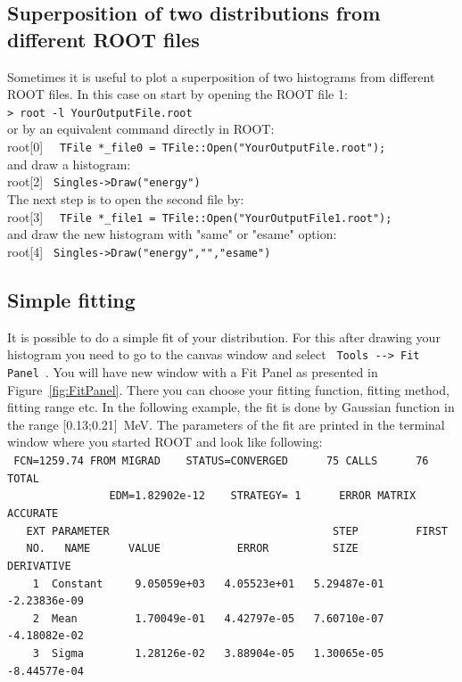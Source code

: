 \documentclass[12pt]{article}
\begin{document}
\clearpage
\subsection{Superposition of two distributions from different ROOT files}
Sometimes it is useful to plot a superposition of two histograms from different ROOT files. In this case on start by opening the ROOT file 1:\\ 

\verb|> root -l YourOutputFile.root |\\

or by an equivalent command directly in ROOT:\\

root[0] \verb|  TFile *_file0 = TFile::Open("YourOutputFile.root");|\\

and draw a histogram:\\

root[2] \verb| Singles->Draw("energy") | \\

The next step is to open the second file by: \\

root[3] \verb|  TFile *_file1 = TFile::Open("YourOutputFile1.root");|\\

and draw the new histogram with "same" or "esame" option:\\

root[4] \verb| Singles->Draw("energy","","esame") |\\


\subsection{Simple fitting}
It is possible to do a simple fit of your distribution. For this after drawing your histogram you need to go to the canvas window and select \verb| Tools --> Fit Panel |. You will have new window with a Fit Panel as presented in Figure~\ref{fig:FitPanel}. There you can choose your fitting function, fitting method, fitting range etc. In the following example, the fit is done by Gaussian function in the range [0.13;0.21]~MeV. The parameters of the fit are printed in the terminal window where you started ROOT and look like following:\\
\verb| FCN=1259.74 FROM MIGRAD    STATUS=CONVERGED      75 CALLS      76 TOTAL|\\
\verb|                EDM=1.82902e-12    STRATEGY= 1      ERROR MATRIX ACCURATE| \\
\verb|   EXT PARAMETER                                   STEP         FIRST|   \\
\verb|   NO.   NAME      VALUE            ERROR          SIZE      DERIVATIVE |\\
\verb|    1  Constant     9.05059e+03   4.05523e+01   5.29487e-01  -2.23836e-09 |\\
\verb|    2  Mean         1.70049e-01   4.42797e-05   7.60710e-07  -4.18082e-02|\\
\verb|    3  Sigma        1.28126e-02   3.88904e-05   1.30065e-05  -8.44577e-04|\\
\end{document}
